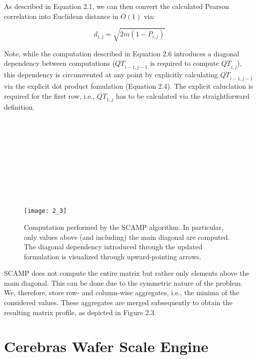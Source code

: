 As described in Equation 2.1, we can then convert the calculated Pearson correlation into Euclidean distance in $O\left(1\right)$ via:

\begin{equation}
    d_{i,j} = \sqrt{2m\left(1 - P_{i,j}\right)}
\end{equation}


Note, while the computation described in Equation 2.6 introduces a diagonal dependency between computations ($\overline{QT}_{i-1,j-1} \text{ is required to compute } \overline{QT}_{i,j}$), this dependency is circumvented at any point by explicitly calculating $\overline{QT}_{i-1,j-1}$ via the explicit dot product fomulation (Equation 2.4). The explicit caluclation is required for the first row, i.e., $\overline{QT}_{1,j}$ has to be calculated via the straightforward definition.\\
\\
\\
\\
\\
\\
\\
\\
\\
\\


\begin{figure}[h!]
    \texttt{[image: 2\_3]}
    \centering
    \caption{Computation performed by the SCAMP algorithm. In particular, only values
        above (and including) the main diagonal are computed. The diagonal
        dependency introduced through the updated formulation is visualized
        through upward-pointing arrows.}
\end{figure}

SCAMP does not compute the entire matrix but rather only elements above the main
diagonal. This can be done due to the symmetric nature of the problem. We, therefore,
store row- and column-wise aggregates, i.e., the minima of the considered values. These
aggregates are merged subsequently to obtain the resulting matrix profile, as depicted
in Figure 2.3.

\section{Cerebras Wafer Scale Engine}

